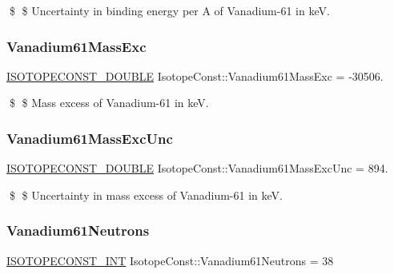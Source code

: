\$ \$ Uncertainty in binding energy per A of Vanadium-\/61 in keV. \mbox{\label{group___isotope_const-_vanadium-_v61_ga72a9513a3915acb0f7d0b00bbad803b7}} 
\subsubsection{\texorpdfstring{Vanadium61\+Mass\+Exc}{Vanadium61MassExc}}
{\footnotesize\ttfamily \mbox{\hyperlink{group___isotope_const-_macros_ga8f45a7272ce02c0b4c65c44636ed719a}{I\+S\+O\+T\+O\+P\+E\+C\+O\+N\+S\+T\+\_\+\+D\+O\+U\+B\+LE}} Isotope\+Const\+::\+Vanadium61\+Mass\+Exc = -\/30506.}

\$ \$ Mass excess of Vanadium-\/61 in keV. \mbox{\label{group___isotope_const-_vanadium-_v61_ga201fe7b3d518a3a169623b7056006ff9}} 
\subsubsection{\texorpdfstring{Vanadium61\+Mass\+Exc\+Unc}{Vanadium61MassExcUnc}}
{\footnotesize\ttfamily \mbox{\hyperlink{group___isotope_const-_macros_ga8f45a7272ce02c0b4c65c44636ed719a}{I\+S\+O\+T\+O\+P\+E\+C\+O\+N\+S\+T\+\_\+\+D\+O\+U\+B\+LE}} Isotope\+Const\+::\+Vanadium61\+Mass\+Exc\+Unc = 894.}

\$ \$ Uncertainty in mass excess of Vanadium-\/61 in keV. \mbox{\label{group___isotope_const-_vanadium-_v61_ga8048146f1ad12eb26ec56d9cab7fa6c3}} 
\subsubsection{\texorpdfstring{Vanadium61\+Neutrons}{Vanadium61Neutrons}}
{\footnotesize\ttfamily \mbox{\hyperlink{group___isotope_const-_macros_ga5f18360b3e99483a35c32d789e62621c}{I\+S\+O\+T\+O\+P\+E\+C\+O\+N\+S\+T\+\_\+\+I\+NT}} Isotope\+Const\+::\+Vanadium61\+Neutrons = 38}

